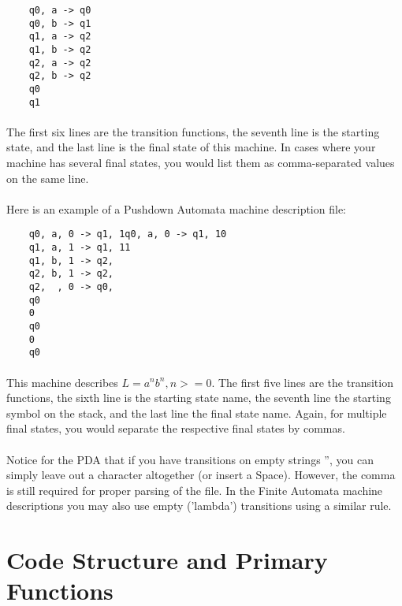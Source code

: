 \documentclass[12pt]{article}
\begin{document}
\begin{verbatim}
    q0, a -> q0
    q0, b -> q1
    q1, a -> q2
    q1, b -> q2
    q2, a -> q2
    q2, b -> q2
    q0
    q1
\end{verbatim}

\paragraph{}
The first six lines are the transition functions, the seventh line is the starting state, and 
the last line is the final state of this machine.  In cases where your machine has several 
final states, you would list them as comma-separated values on the same line.

\paragraph{}
Here is an example of a Pushdown Automata machine description file:

\begin{verbatim}
    q0, a, 0 -> q1, 1q0, a, 0 -> q1, 10
    q1, a, 1 -> q1, 11
    q1, b, 1 -> q2,
    q2, b, 1 -> q2,
    q2,  , 0 -> q0,
    q0
    0
    q0
    0
    q0
\end{verbatim}

\paragraph{}
This machine describes $L = {a^nb^n, n >= 0}$.  The first five lines are the transition 
functions, the sixth line is the starting state name, the seventh line the starting symbol on 
the stack, and the last line the final state name.  Again, for multiple final states, you 
would separate the respective final states by commas.

\paragraph{}
Notice for the PDA that if you have transitions on empty strings '', you can simply leave out 
a character altogether (or insert a Space).  However, the comma is still required for proper 
parsing of the file.  In the Finite Automata machine descriptions you may also use empty 
('lambda') transitions using a similar rule.

\section{Code Structure and Primary Functions}
\end{document}

